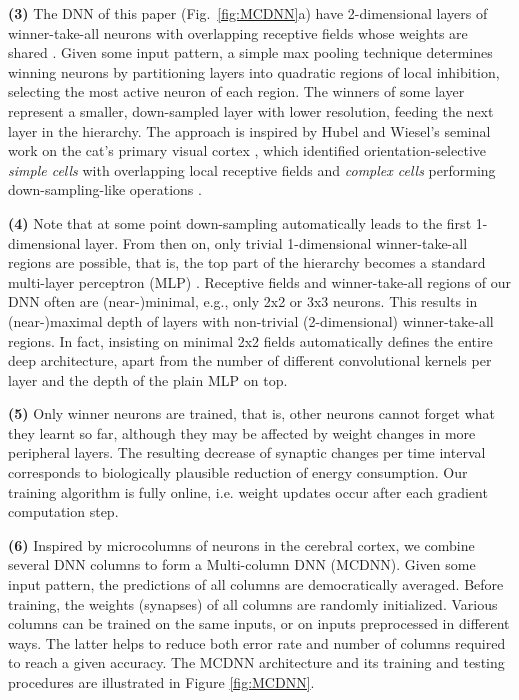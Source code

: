 \documentclass[a4paper]{article}
\begin{document}
{\bf (3)}
The DNN of this paper (Fig.~\ref{fig:MCDNN}a) have 2-dimensional layers of winner-take-all neurons \cite{Kohonen:88,WillshawMalsburg:76} with overlapping receptive fields whose weights are shared \cite{lecun:1998,behnke:2003,simard:2003,Ciresan:2011a}. Given some input pattern, a simple max pooling technique \cite{Riesenhuber:1999} determines winning neurons by partitioning layers into quadratic regions of local inhibition, selecting the most active neuron of each region. The winners of some layer represent a smaller, down-sampled layer with lower resolution, feeding the next layer in the hierarchy.
 The approach is inspired by Hubel and Wiesel's seminal work on the cat's primary visual cortex \cite{Wiesel:1959}, which identified orientation-selective \emph{simple cells} with overlapping local receptive fields and \emph{complex cells} performing down-sampling-like operations \cite{Hubel:1962}.

{\bf (4)}
Note that at some point down-sampling automatically leads to the first 1-dimensional layer.
From then on, only trivial 1-dimensional winner-take-all regions are possible, that is, the top part of the hierarchy
becomes a standard multi-layer perceptron (MLP) \cite{Werbos:74,LeCun:85,Rumelhart:86}.
Receptive fields and winner-take-all regions of our DNN often are (near-)minimal, e.g., only 2x2 or 3x3 neurons.
This results in (near-)maximal depth of  layers with non-trivial (2-dimensional) winner-take-all regions.
In fact, insisting on minimal 2x2 fields automatically defines the entire deep architecture,
apart from the number of different convolutional kernels per layer \cite{lecun:1998,behnke:2003,simard:2003,Ciresan:2011a}
and the depth of the plain MLP on top.

{\bf (5)}
Only winner neurons are trained, that is,
other neurons cannot forget what they learnt so far, although they may be affected by weight changes in more peripheral layers.
The resulting decrease of synaptic changes per time interval corresponds to biologically plausible reduction of energy consumption.
Our training algorithm is fully online, i.e. weight updates occur after each gradient computation step.

{\bf (6)}
Inspired by microcolumns of neurons in the cerebral cortex, we combine several DNN columns to form a Multi-column DNN (MCDNN). Given some input pattern, the predictions of all columns are democratically averaged. Before training, the weights (synapses) of all columns are randomly initialized. Various columns can be trained on the same inputs, or on inputs preprocessed in different ways.  The latter helps to reduce both error rate and number of columns required to reach a given accuracy. The MCDNN architecture and its training and testing procedures are illustrated in Figure \ref{fig:MCDNN}.
\end{document}
